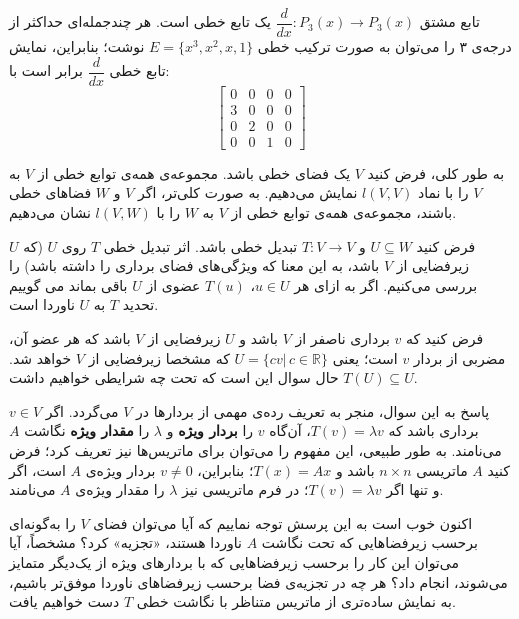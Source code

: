 \begin{example}
تابع مشتق $\dfrac{d}{dx}: P_{3}(x) \xrightarrow{} P_{3}(x)$ یک تابع خطی است. هر چندجمله‌ای حداکثر از درجه‌ی ۳ را می‌توان به صورت ترکیب خطی $E = \{x^3,x^2,x,1\}$ نوشت؛ بنابراین، نمایش تابع خطی $\dfrac{d}{dx}$ برابر است با:
\begin{equation*}
\begin{bmatrix}
0 & 0 & 0 &0\\
3 & 0 & 0 &0\\
0 & 2 & 0 &0\\
0 & 0 & 1 &0
\end{bmatrix}
\end{equation*}
\end{example}

\begin{definition}
به طور کلی، فرض کنید $V$ یک فضا‌ی خطی باشد. مجموعه‌ی همه‌ی توابع خطی از $V$ به $V$ را با نماد $l(V,V)$ نمایش می‌دهیم. به صورت کلی‌تر، اگر $V$ و $W$ فضا‌های خطی باشند، مجموعه‌ی همه‌ی توابع خطی از $V$ به $W$ را با $l(V,W)$ نشان می‌دهیم.
\end{definition}
\begin{definition}
فرض کنید $U\subseteq W$ و $T: V\xrightarrow{}V$ تبدیل خطی باشد. اثر تبدیل خطی $T$ روی $U$ (که $U$ زیرفضایی از $V$ باشد، به این معنا که ویژگی‌های فضای برداری را داشته باشد) را بررسی می‌کنیم. اگر به ازای هر $u \in U$، $T(u)$ عضوی از $U$ باقی بماند می‌
گوییم تحدید $T$ به $U$ ناوردا است.
\end{definition}
فرض کنید که $v$ برداری ناصفر از $V$ باشد و $U$ زیرفضا‌یی از $V$ باشد که هر عضو آن، مضربی از بردار $v$ است؛ یعنی $U = \{cv |\,c \in \mathbb{R}\}$ که مشخصا زیرفضا‌یی از $V$ خواهد شد. حال سوال این است که تحت چه شرایطی خواهیم داشت $T(U)\subseteq U$.

پاسخ به این سوال، منجر به تعریف رده‌ی مهمی از بردار‌ها در $V$ می‌گردد. اگر $v \in V$ برداری باشد که $T(v) = \lambda v$، آن‌گاه $v$ را \textbf{بردار ویژه} و $\lambda$ را \textbf{مقدار ویژه} نگاشت $A$ می‌نامند. به طور طبیعی، این مفهوم را می‌توان برای ماتریس‌ها نیز تعریف کرد؛ فرض کنید $A$ ماتریسی $n \times n$ باشد و $T(x) = Ax$؛ بنابراین، $v \neq 0$ بردار ویژه‌ی $A$ است، اگر و تنها اگر $T(v) = \lambda v$؛ در فرم ماتریسی نیز $\lambda$ را مقدار ویژه‌ی $A$ می‌نامند.

اکنون خوب است به این پرسش توجه نماییم که آیا می‌توان فضای $V$ را به‌گونه‌ای برحسب زیرفضاهایی که تحت نگاشت $A$ ناوردا هستند، «تجزیه» کرد؟ مشخصاً، آیا می‌توان این کار را برحسب زیرفضاهایی که با بردارهای ویژه از یک‌دیگر متمایز می‌شوند، انجام داد؟
هر چه در تجزیه‌ی فضا برحسب زیرفضاهای ناوردا موفق‌تر باشیم، به نمایش ساده‌تری از ماتریس متناظر با نگاشت خطی $T$ دست خواهیم یافت.

